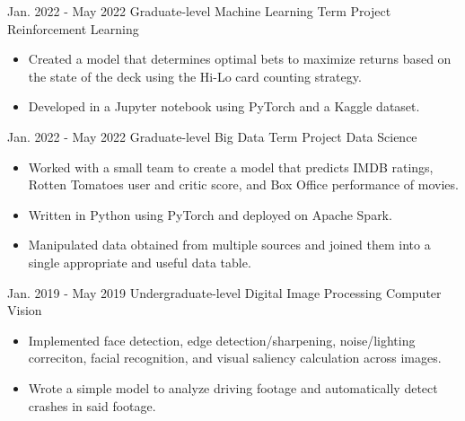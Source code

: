 \documentclass[8pt]{resumeclass}
\begin{document}
\begin{entrylist}
	\entry
		{Jan. 2022 - May 2022}
		{Graduate-level Machine Learning Term Project}
		{Reinforcement Learning}
		{\vspace{-4mm}\begin{itemize}[noitemsep,nolistsep]
			\small
			\item Created a model that determines optimal bets to maximize returns based on the state of the deck using the Hi-Lo card counting strategy.
			\item Developed in a Jupyter notebook using PyTorch and a Kaggle dataset.
		\end{itemize}}
	\entry
		{Jan. 2022 - May 2022}
		{Graduate-level Big Data Term Project}
		{Data Science}
		{\vspace{-4mm}\begin{itemize}[noitemsep,nolistsep]
			\small
			\item Worked with a small team to create a model that predicts IMDB ratings, Rotten Tomatoes user and critic score, and Box Office performance of movies.
			\item Written in Python using PyTorch and deployed on Apache Spark.
			\item Manipulated data obtained from multiple sources and joined them into a single appropriate and useful data table.
		\end{itemize}}
	\entry
		{Jan. 2019 - May 2019}
		{Undergraduate-level Digital Image Processing}
		{Computer Vision}
		{{\vspace{-4mm}\begin{itemize}[noitemsep,nolistsep]
			\small
			\item Implemented face detection, edge detection/sharpening, noise/lighting correciton, facial recognition, and visual saliency calculation across images.
			\item Wrote a simple model to analyze driving footage and automatically detect crashes in said footage.
		\end{itemize}}}
\end{entrylist}


\end{document}
